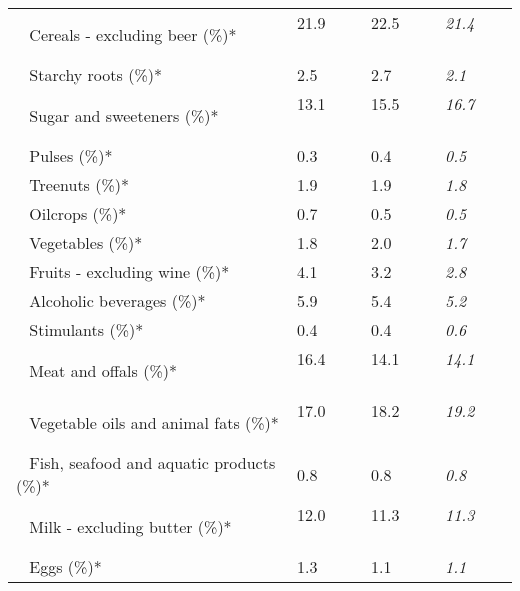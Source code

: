 \begin{tabular}{L{3.9cm} R{1cm} R{1cm} R{1cm}}
	 ~ Cereals - excluding beer (\%)* & 21.9 ~ \ \ & 22.5 ~ \ \ & \textit{21.4} ~ \ \ \\ 
	 ~ Starchy roots (\%)* & 2.5 ~ \ \ & 2.7 ~ \ \ & \textit{2.1} ~ \ \ \\ 
	 ~ Sugar and sweeteners (\%)* & 13.1 ~ \ \ & 15.5 ~ \ \ & \textit{16.7} ~ \ \ \\ 
	 ~ Pulses (\%)* & 0.3 ~ \ \ & 0.4 ~ \ \ & \textit{0.5} ~ \ \ \\ 
	 ~ Treenuts (\%)* & 1.9 ~ \ \ & 1.9 ~ \ \ & \textit{1.8} ~ \ \ \\ 
	 ~ Oilcrops (\%)* & 0.7 ~ \ \ & 0.5 ~ \ \ & \textit{0.5} ~ \ \ \\ 
	 ~ Vegetables (\%)* & 1.8 ~ \ \ & 2.0 ~ \ \ & \textit{1.7} ~ \ \ \\ 
	 ~ Fruits - excluding wine (\%)* & 4.1 ~ \ \ & 3.2 ~ \ \ & \textit{2.8} ~ \ \ \\ 
	 ~ Alcoholic beverages (\%)* & 5.9 ~ \ \ & 5.4 ~ \ \ & \textit{5.2} ~ \ \ \\ 
	 ~ Stimulants (\%)* & 0.4 ~ \ \ & 0.4 ~ \ \ & \textit{0.6} ~ \ \ \\ 
	 ~ Meat and offals (\%)* & 16.4 ~ \ \ & 14.1 ~ \ \ & \textit{14.1} ~ \ \ \\ 
	 ~ Vegetable oils and animal fats (\%)* & 17.0 ~ \ \ & 18.2 ~ \ \ & \textit{19.2} ~ \ \ \\ 
	 ~ Fish, seafood and aquatic products (\%)* & 0.8 ~ \ \ & 0.8 ~ \ \ & \textit{0.8} ~ \ \ \\ 
	 ~ Milk - excluding butter (\%)* & 12.0 ~ \ \ & 11.3 ~ \ \ & \textit{11.3} ~ \ \ \\ 
	 ~ Eggs (\%)* & 1.3 ~ \ \ & 1.1 ~ \ \ & \textit{1.1} ~ \ \ \\ 
       \toprule
      \end{tabular}
      \clearpage
{}
